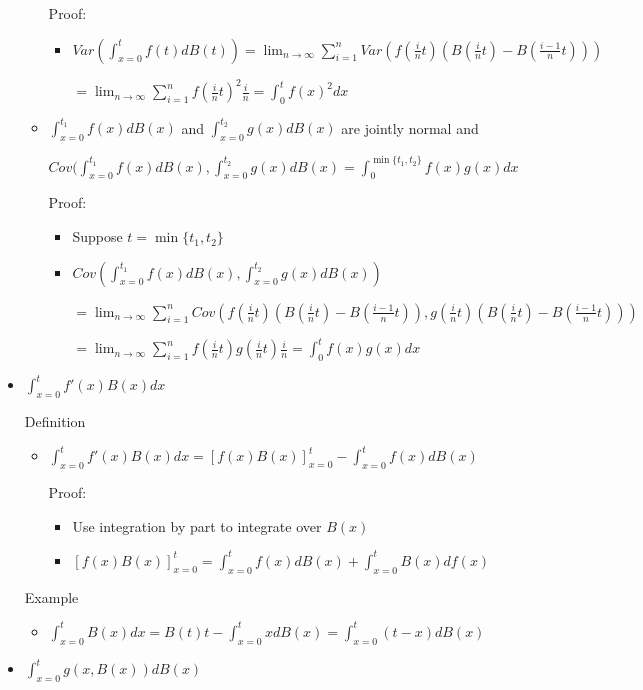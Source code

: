 \documentclass[a4paper]{article}
\begin{document}
\begin{itemize}
\begin{itemize}
                Proof:
                \begin{itemize}
                    \item $\mathit{Var}(\int_{x=0}^t f(t) dB(t)) = \lim_{n \rightarrow \infty} \sum_{i=1}^n \mathit{Var}(f(\frac{i}{n}t)(B(\frac{i}{n}t) - B(\frac{i-1}{n}t)))$

                        $= \lim_{n \rightarrow \infty} \sum_{i=1}^n f(\frac{i}{n}t)^2 \frac{i}{n} = \int_0^t f(x)^2 dx$
                \end{itemize}
            \item $\int_{x=0}^{t_1} f(x) dB(x)$ and $\int_{x=0}^{t_2} g(x) dB(x)$ are jointly normal and

                $\mathit{Cov}(\int_{x=0}^{t_1} f(x) dB(x), \int_{x=0}^{t_2} g(x) dB(x) = \int_0^{\min\{t_1, t_2\}} f(x)g(x) dx$

                Proof:
                \begin{itemize}
                    \item Suppose $t = \min\{t_1, t_2\}$
                    \item $\mathit{Cov}(\int_{x=0}^{t_1} f(x) dB(x), \int_{x=0}^{t_2} g(x) dB(x))$

                        $= \lim_{n \rightarrow \infty} \sum_{i=1}^n \mathit{Cov}(f(\frac{i}{n}t)(B(\frac{i}{n}t) - B(\frac{i-1}{n}t)), g(\frac{i}{n}t)(B(\frac{i}{n}t) - B(\frac{i-1}{n}t)))$

                        $= \lim_{n \rightarrow \infty} \sum_{i=1}^n f(\frac{i}{n}t)g(\frac{i}{n}t) \frac{i}{n} = \int_0^t f(x)g(x) dx$
                \end{itemize}
        \end{itemize}
    \item $\int_{x=0}^t f'(x) B(x) dx$

        Definition
        \begin{itemize}
            \item $\int_{x = 0}^t f'(x) B(x) dx = [f(x) B(x)]_{x=0}^t - \int_{x = 0}^t f(x) dB(x)$

                Proof:
                \begin{itemize}
                    \item Use integration by part to integrate over $B(x)$
                    \item $[f(x) B(x)]_{x=0}^t = \int_{x = 0}^t f(x) dB(x) + \int_{x = 0}^t B(x) df(x)$
                \end{itemize}
        \end{itemize}
        Example
        \begin{itemize}
            \item $\int_{x = 0}^t B(x) dx = B(t)t - \int_{x=0}^t x dB(x) = \int_{x=0}^t (t-x) dB(x)$
        \end{itemize}
    \item $\int_{x=0}^t g(x, B(x)) dB(x)$


\end{itemize}
\end{document}
